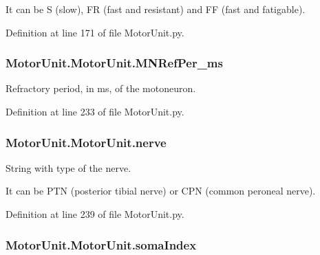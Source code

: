 It can be S (slow), F\-R (fast and resistant) and F\-F (fast and fatigable). 

Definition at line 171 of file Motor\-Unit.\-py.

\hypertarget{class_motor_unit_1_1_motor_unit_abbdaa195ac00926d96d509ae01dcda05}{
\subsubsection[{M\-N\-Ref\-Per\-\_\-ms}]{\setlength{\rightskip}{0pt plus 5cm}Motor\-Unit.\-Motor\-Unit.\-M\-N\-Ref\-Per\-\_\-ms}}\label{class_motor_unit_1_1_motor_unit_abbdaa195ac00926d96d509ae01dcda05}


Refractory period, in ms, of the motoneuron. 



Definition at line 233 of file Motor\-Unit.\-py.

\hypertarget{class_motor_unit_1_1_motor_unit_a754ee6b88fc2a09899da9f9b13bfbf59}{
\subsubsection[{nerve}]{\setlength{\rightskip}{0pt plus 5cm}Motor\-Unit.\-Motor\-Unit.\-nerve}}\label{class_motor_unit_1_1_motor_unit_a754ee6b88fc2a09899da9f9b13bfbf59}


String with type of the nerve. 

It can be P\-T\-N (posterior tibial nerve) or C\-P\-N (common peroneal nerve). 

Definition at line 239 of file Motor\-Unit.\-py.

\hypertarget{class_motor_unit_1_1_motor_unit_a7cd2be92814b5892bdd18dafd824da9f}{
\subsubsection[{soma\-Index}]{\setlength{\rightskip}{0pt plus 5cm}Motor\-Unit.\-Motor\-Unit.\-soma\-Index}}\label{class_motor_unit_1_1_motor_unit_a7cd2be92814b5892bdd18dafd824da9f}


